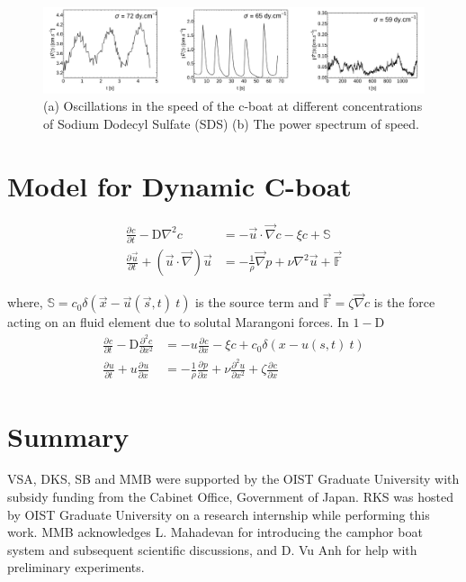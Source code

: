 \documentclass[aps, twocolumn, floatfix, superscriptaddress]{revtex4}
\newcommand{\pdc}[3][]{\frac{\partial^{#1} #2}{\partial #3^{#1}}} %
\begin{document}
\begin{figure}[ht]
    \begin{center}
       \includegraphics[scale=0.1]{figure8.pdf}
    \end{center}
    \caption{(a) Oscillations in the speed of the c-boat at different concentrations of Sodium Dodecyl Sulfate (SDS) (b) The power spectrum of speed.}
    \label{fig:absvsds}
\end{figure}
\section{Model for Dynamic C-boat}
\begin{align}
\pdc{c}{t} - \mathrm{D} \nabla^{2}c &= - \vec{u} \cdot \vec{\nabla} c  - \xi c + \mathbb{S}\\
\pdc{\vec{u}}{t} + \left(\vec{u} \cdot \vec{\nabla} \right)\vec{u} &= -\frac{1}{\rho}\vec{\nabla} p + \nu \nabla^{2}\vec{u}+ \vec{\mathbb{F}}
\end{align}

where, $\mathbb{S} = c_{0}\delta\left(\vec{x}-\vec{u}(\vec{s}, t)\ t\right)$ is the source term and $\vec{\mathbb{F}} = \zeta \vec{\nabla}c$ is the force acting on an fluid element due to solutal Marangoni forces. In $1-\mathrm{D}$
\begin{align}
\pdc{c}{t} - \mathrm{D} \pdc[2]{c}{x} &= - u\pdc{c}{x}  - \xi c + c_{0}\delta\left(x-u(s, t)\ t\right)\\
\pdc{u}{t} + u\pdc{u}{x} &= -\frac{1}{\rho}\pdc{p}{x} + \nu \pdc[2]{u}{x}+ \zeta \pdc{c}{x}
\end{align}
\section{Summary}
\label{sec:summary}


\acknowledgments
VSA, DKS, SB and MMB were supported by the OIST Graduate University with subsidy funding from the Cabinet Office, Government of Japan. RKS was hosted by OIST Graduate University on a research internship while performing this work. MMB acknowledges L. Mahadevan for introducing the camphor boat system and subsequent scientific discussions, and D. Vu Anh for help with preliminary experiments.


\end{document}
